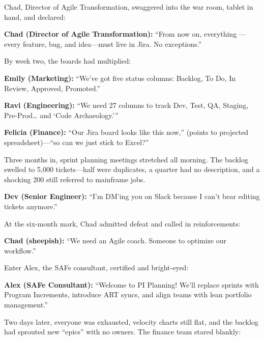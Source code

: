 Chad, Director of Agile Transformation, swaggered into the war room,  
tablet in hand, and declared:

\medskip

\textbf{Chad (Director of Agile Transformation):} “From now on, everything  
—every feature, bug, and idea—must live in Jira. No exceptions.”

\medskip

By week two, the boards had multiplied:

\medskip

\textbf{Emily (Marketing):} “We’ve got five status columns: Backlog, To Do,  
In Review, Approved, Promoted.”

\medskip

\textbf{Ravi (Engineering):} “We need 27 columns to track Dev, Test, QA,  
Staging, Pre-Prod… and ‘Code Archaeology.’”

\medskip

\textbf{Felicia (Finance):} “Our Jira board looks like this now,” (points to  
projected spreadsheet)—“so can we just stick to Excel?”

\medskip

Three months in, sprint planning meetings stretched all morning. The backlog  
swelled to 5,000 tickets—half were duplicates, a quarter had no description,  
and a shocking 200 still referred to mainframe jobs.

\medskip

\textbf{Dev (Senior Engineer):} “I’m DM’ing you on Slack because I can’t bear  
editing tickets anymore.”

\medskip

At the six-month mark, Chad admitted defeat and called in reinforcements:

\medskip

\textbf{Chad (sheepish):} “We need an Agile coach. Someone to optimize our  
workflow.”

\medskip

Enter Alex, the SAFe consultant, certified and bright-eyed:

\medskip

\textbf{Alex (SAFe Consultant):} “Welcome to PI Planning! We’ll replace sprints  
with Program Increments, introduce ART syncs, and align teams with lean  
portfolio management.”

\medskip

Two days later, everyone was exhausted, velocity charts still flat, and the  
backlog had sprouted new “epics” with no owners. The finance team stared blankly:

